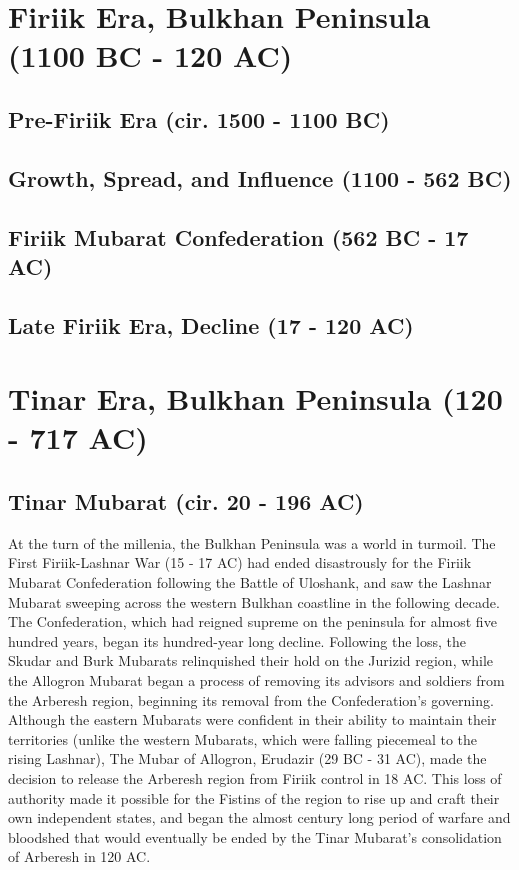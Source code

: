 \section{Firiik Era, Bulkhan Peninsula (1100 BC - 120 AC)}
	\subsection{Pre-Firiik Era (cir. 1500 - 1100 BC)}
	\subsection{Growth, Spread, and Influence (1100 - 562 BC)}
	\subsection{Firiik Mubarat Confederation (562 BC - 17 AC)}
	\subsection{Late Firiik Era, Decline (17 - 120 AC)}
\section{Tinar Era, Bulkhan Peninsula (120 - 717 AC)}
	\subsection{Tinar Mubarat (cir. 20 - 196 AC)}
		At the turn of the millenia, the Bulkhan Peninsula was a world in turmoil. The First Firiik-Lashnar War (15 - 17 AC) had ended disastrously for the Firiik Mubarat Confederation following the Battle of Uloshank, and saw the Lashnar Mubarat sweeping across the western Bulkhan coastline in the following decade. The Confederation, which had reigned supreme on the peninsula for almost five hundred years, began its hundred-year long decline. Following the loss, the Skudar and Burk Mubarats relinquished their hold on the Jurizid region, while the Allogron Mubarat began a process of removing its advisors and soldiers from the Arberesh region, beginning its removal from the Confederation's governing. Although the eastern Mubarats were confident in their ability to maintain their territories (unlike the western Mubarats, which were falling piecemeal to the rising Lashnar), The Mubar of Allogron, Erudazir (29 BC - 31 AC), made the decision to release the Arberesh region from Firiik control in 18 AC. This loss of authority made it possible for the Fistins of the region to rise up and craft their own independent states, and began the almost century long period of warfare and bloodshed that would eventually be ended by the Tinar Mubarat's consolidation of Arberesh in 120 AC. 
